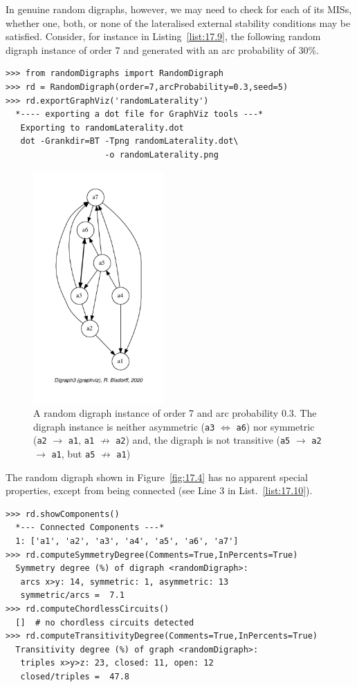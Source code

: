 In genuine random digraphs, however, we may need to check for each of its MISs, whether one, both, or none of the lateralised external stability conditions may be satisfied. Consider, for instance in Listing~\vref{list:17.9}, the following random digraph instance of order 7 and generated with an arc probability of $30\%$. 
\begin{lstlisting}[caption={Generating a random digraph \texttt{rd} of order 7 and arc probability 0.3},label=list:17.9]
>>> from randomDigraphs import RandomDigraph
>>> rd = RandomDigraph(order=7,arcProbability=0.3,seed=5)
>>> rd.exportGraphViz('randomLaterality')
  *---- exporting a dot file for GraphViz tools ---*
   Exporting to randomLaterality.dot
   dot -Grankdir=BT -Tpng randomLaterality.dot\
                    -o randomLaterality.png
\end{lstlisting}
\begin{figure}[ht]
\sidecaption[t]
\includegraphics[width=5cm]{Figures/17-4-randomLaterality.pdf}
\caption{A random digraph instance of order 7 and arc probability 0.3. The digraph instance is neither asymmetric (\texttt{a3} $\Leftrightarrow$ \texttt{a6}) nor symmetric (\texttt{a2} $\rightarrow$ \texttt{a1}, \texttt{a1} $\not\rightarrow$ \texttt{a2}) and, the digraph is not transitive (\texttt{a5} $\rightarrow$ \texttt{a2} $\rightarrow$ \texttt{a1}, but \texttt{a5} $\not\rightarrow$ \texttt{a1})} 
\label{fig:17.4}       %
\end{figure}

The random digraph shown in Figure~\vref{fig:17.4} has no apparent special properties, except from being connected (see Line 3 in List.~\vref{list:17.10}).
\begin{lstlisting}[caption={Inspecting the properties of random digraph \texttt{rd}},label=list:17.10]
>>> rd.showComponents()
  *--- Connected Components ---*
  1: ['a1', 'a2', 'a3', 'a4', 'a5', 'a6', 'a7']
>>> rd.computeSymmetryDegree(Comments=True,InPercents=True)
  Symmetry degree (%) of digraph <randomDigraph>:
   arcs x>y: 14, symmetric: 1, asymmetric: 13
   symmetric/arcs =  7.1
>>> rd.computeChordlessCircuits()
  []  # no chordless circuits detected
>>> rd.computeTransitivityDegree(Comments=True,InPercents=True)
  Transitivity degree (%) of graph <randomDigraph>:
   triples x>y>z: 23, closed: 11, open: 12
   closed/triples =  47.8
\end{lstlisting}

